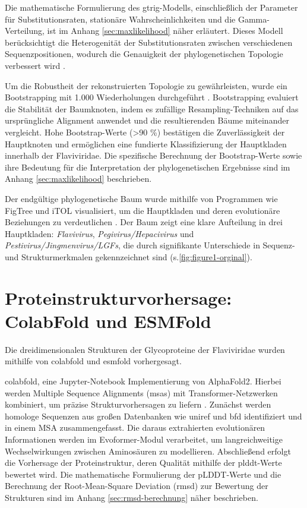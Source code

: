 Die mathematische Formulierung des \gls{gtrig}-Modells, einschließlich der Parameter für Substitutionsraten, stationäre Wahrscheinlichkeiten und die Gamma-Verteilung, ist im Anhang \ref{sec:maxlikelihood} näher erläutert. Dieses Modell berücksichtigt die Heterogenität der Substitutionsraten zwischen verschiedenen Sequenzpositionen, wodurch die Genauigkeit der phylogenetischen Topologie verbessert wird \autocite{yangMaximumLikelihoodPhylogenetic1994}.

Um die Robustheit der rekonstruierten Topologie zu gewährleisten, wurde ein Bootstrapping mit 1.000 Wiederholungen durchgeführt \autocite{Felsenstein1985}. Bootstrapping evaluiert die Stabilität der Baumknoten, indem es zufällige Resampling-Techniken auf das ursprüngliche Alignment anwendet und die resultierenden Bäume miteinander vergleicht. Hohe Bootstrap-Werte (>90 \%) bestätigen die Zuverlässigkeit der Hauptknoten und ermöglichen eine fundierte Klassifizierung der Hauptkladen innerhalb der Flaviviridae. Die spezifische Berechnung der Bootstrap-Werte sowie ihre Bedeutung für die Interpretation der phylogenetischen Ergebnisse sind im Anhang \ref{sec:maxlikelihood} beschrieben.

Der endgültige phylogenetische Baum wurde mithilfe von Programmen wie FigTree und iTOL visualisiert, um die Hauptkladen und deren evolutionäre Beziehungen zu verdeutlichen \autocite{letunicInteractiveTreeLife2021}. Der Baum zeigt eine klare Aufteilung in drei Hauptkladen: \textit{Flavivirus}, \textit{Pegivirus/Hepacivirus} und \textit{Pestivirus/Jingmenvirus/LGFs}, die durch signifikante Unterschiede in Sequenz- und Strukturmerkmalen gekennzeichnet sind (s.\ref{fig:figure1-orginal}).

\section{Proteinstrukturvorhersage: ColabFold und ESMFold} \label{sec:colabfold-esmfold}

Die dreidimensionalen Strukturen der Glycoproteine der Flaviviridae wurden mithilfe von \gls{colabfold} und \gls{esmfold} vorhergesagt.

\gls{colabfold}, eine Jupyter-Notebook Implementierung von AlphaFold2. Hierbei werden Multiple Sequence Alignments (\glspl{msa}) mit Transformer-Netzwerken kombiniert, um präzise Strukturvorhersagen zu liefern \autocite{Mirdita2022}. Zunächst werden homologe Sequenzen aus großen Datenbanken wie \gls{uniref} und \gls{bfd} identifiziert und in einem MSA zusammengefasst. Die daraus extrahierten evolutionären Informationen werden im Evoformer-Modul verarbeitet, um langreichweitige Wechselwirkungen zwischen Aminosäuren zu modellieren. Abschließend erfolgt die Vorhersage der Proteinstruktur, deren Qualität mithilfe der \gls{plddt}-Werte bewertet wird. Die mathematische Formulierung der pLDDT-Werte und die Berechnung der Root-Mean-Square Deviation (\gls{rmsd}) zur Bewertung der Strukturen sind im Anhang \ref{sec:rmsd-berechnung} näher beschrieben.

